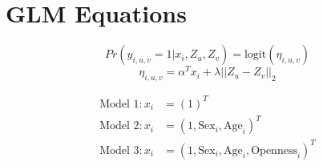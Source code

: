 \documentclass{article}
\begin{document}
\section*{GLM Equations}
\begin{equation}
Pr(y_{i, u, v} = 1|x_i, Z_u, Z_v) = \text{logit}(\eta_{i, u, v})
\end{equation}
\begin{equation}
\eta_{i, u, v} = \alpha^{T}x_i + \lambda||Z_u - Z_v||_2 
\end{equation}

\begin{align*}
\text{Model 1}: x_i &= (1)^T \\
\text{Model 2}: x_i &= (1, \text{Sex}_i, \text{Age}_i)^T \\
\text{Model 3}: x_i &= (1, \text{Sex}_i, \text{Age}_i, \text{Openness}_i)^T 
\end{align*}
\end{document}
